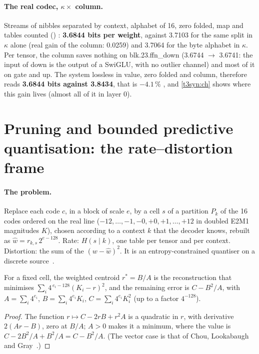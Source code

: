 \paragraph{The real codec, $\kappa \times$ column.} Streams of nibbles separated by context, alphabet of 16, zero folded, map and tables counted () \mes: \textbf{3.6844 bits per weight}, against 3.7103 for the same split in $\kappa$ alone (real gain of the column: 0.0259) and 3.7064 for the byte alphabet in $\kappa$. Per tensor, the column saves nothing on blk.23.ffn\_down (3.6744 $\to$ 3.6741: the input of down is the output of a SwiGLU, with no outlier channel) and most of it on gate and up. The system lossless in value, zero folded and column, therefore reads \textbf{3.6844 bits against 3.8434}, that is $-4.1\,\%$ \calc, and \cref{t3syn:ch} shows where this gain lives (almost all of it in layer 0).

\section{Pruning and bounded predictive quantisation: the rate--distortion frame}\label{t3pre:sec:cadre}

\paragraph{The problem.} Replace each code $c$, in a block of scale $e$, by a cell $s$ of a partition $P_k$ of the 16 codes ordered on the real line ($-12, \ldots, -1, -0, +0, +1, \ldots, +12$ in doubled E2M1 magnitudes $K$), chosen according to a context $k$ that the decoder knows, rebuilt as $\hat w = r_{k,s}\, 2^{e-128}$. Rate: $H(s \mid k)$, one table per tensor and per context. Distortion: the sum of the $(w - \hat w)^2$. It is an entropy-constrained quantiser on a discrete source~\cite{genome-pe-chou1989ecvq,genome-pe-farvardin1984}.

\begin{lemme}\label{t3pre:lem:centre}
For a fixed cell, the weighted centroid $r^\ast = B/A$ is the reconstruction that minimises $\sum_i 4^{\,e_i - 128}(K_i - r)^2$, and the remaining error is $C - B^2/A$, with $A = \sum_i 4^{e_i}$, $B = \sum_i 4^{e_i} K_i$, $C = \sum_i 4^{e_i} K_i^2$ (up to a factor $4^{-128}$).
\end{lemme}

\begin{proof}
The function $r \mapsto C - 2rB + r^2 A$ is a quadratic in $r$, with derivative $2(Ar - B)$, zero at $B/A$; $A > 0$ makes it a minimum, where the value is $C - 2B^2/A + B^2/A = C - B^2/A$. (The vector case is that of Chou, Lookabaugh and Gray~\cite{genome-pe-chou1989ecvq}.)
\end{proof}

